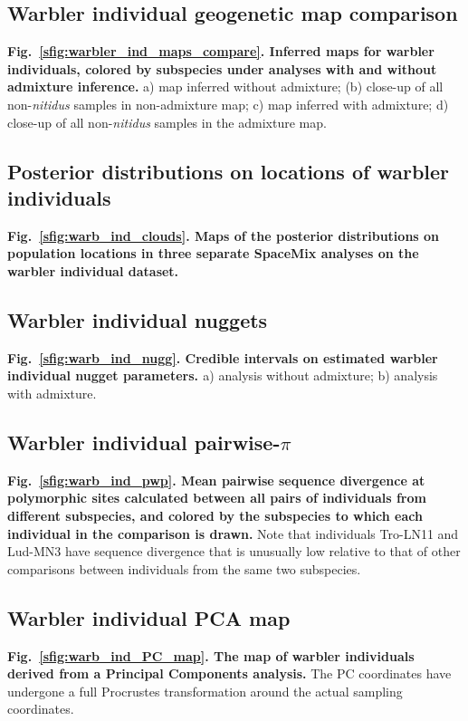 \documentclass[10pt,letterpaper]{article}
\begin{document}
\subsection*{Warbler individual geogenetic map comparison}
\label{warbler_ind_maps_compare}
{\bf{Fig.\ \ref{sfig:warbler_ind_maps_compare}. Inferred maps for warbler individuals, colored by subspecies under analyses with and without admixture inference.}} a) map inferred without admixture; (b) close-up of all non-\textit{nitidus} samples in non-admixture map; c) map inferred with admixture; d) close-up of all non-\textit{nitidus} samples in the admixture map.

\subsection*{Posterior distributions on locations of warbler individuals}
\label{warb_ind_clouds}
{\bf{Fig.\ \ref{sfig:warb_ind_clouds}. Maps of the posterior distributions on population locations in three separate SpaceMix analyses on the warbler individual dataset.}}

\subsection*{Warbler individual nuggets}
\label{warb_ind_nugg}
{\bf{Fig.\ \ref{sfig:warb_ind_nugg}. Credible intervals on estimated warbler individual nugget parameters. }} a) analysis without admixture; b) analysis with admixture.

\subsection*{Warbler individual pairwise-$\pi$}
\label{warb_ind_pwp}
{\bf{Fig.\ \ref{sfig:warb_ind_pwp}. Mean pairwise sequence divergence at polymorphic sites calculated between all pairs of individuals from different subspecies, and colored by the subspecies to which each individual in the comparison is drawn.}} Note that individuals Tro-LN11 and Lud-MN3 have sequence divergence that is unusually low relative to that of other comparisons between individuals from the same two subspecies.

\subsection*{Warbler individual PCA map}
\label{warb_ind_PC_map}
{\bf{Fig.\ \ref{sfig:warb_ind_PC_map}. The map of warbler individuals derived from a Principal Components analysis.}} The PC coordinates have undergone a full Procrustes transformation around the actual sampling coordinates.
\end{document}
